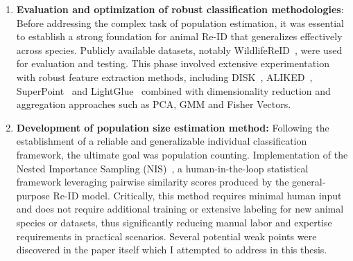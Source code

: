 \begin{enumerate}
    \item \textbf{Evaluation and optimization of robust classification methodologies}: Before addressing the complex task of population estimation, it was essential to establish a strong foundation for animal Re-ID that generalizes effectively across species. Publicly available datasets, notably WildlifeReID~\cite{čermák2023wildlifedatasetsopensourcetoolkitanimal}, were used for evaluation and testing. This phase involved extensive experimentation with robust feature extraction methods, including DISK~\cite{tyszkiewicz2020disklearninglocalfeatures}, ALIKED~\cite{zhao2023alikedlighterkeypointdescriptor}, SuperPoint~\cite{DeTone2018SuperPoint} and LightGlue~\cite{lindenberger2023lightgluelocalfeaturematching} combined with dimensionality reduction and aggregation approaches such as PCA, GMM and Fisher Vectors.
    \item \textbf{Development of population size estimation method: } Following the establishment of a reliable and generalizable individual classification framework, the ultimate goal was population counting. Implementation of the Nested Importance Sampling (NIS)~\cite{perez2024humanintheloopvisualreidpopulation}, a human-in-the-loop statistical framework leveraging pairwise similarity scores produced by the general-purpose Re-ID model. Critically, this method requires minimal human input and does not require additional training or extensive labeling for new animal species or datasets, thus significantly reducing manual labor and expertise requirements in practical scenarios. Several potential weak points were discovered in the paper itself which I attempted to address in this thesis. 
\end{enumerate}



